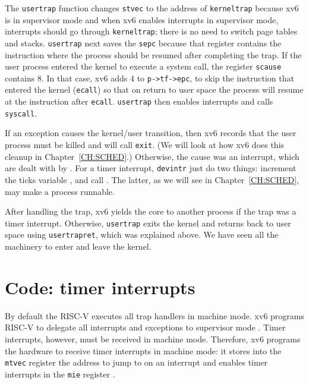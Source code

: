 The \lstinline{usertrap} function changes \lstinline{stvec} to the
address of \lstinline{kerneltrap} because xv6 is in supervisor mode and
when xv6 enables interrupts in supervisor mode, interrupts should go
through \lstinline{kerneltrap}; there is no need to switch page tables
and stacks. \lstinline{usertrap} next saves the \lstinline{sepc}
because that register contains the instruction where the process
should be resumed after completing the trap.
If the user process entered the kernel to execute a system
call, the register \lstinline{scause} contains 8.  In that case, xv6
adds 4 to \lstinline{p->tf->epc}, to skip the instruction that entered
the kernel (\lstinline{ecall}) so that on return to user space the
process will resume at the instruction after \lstinline{ecall}.
\lstinline{usertrap} then enables interrupts and calls
\lstinline{syscall}.

If an exception causes the kernel/user transition, then xv6 records
that the user process must be killed and will call \lstinline{exit}.
(We will look at how xv6 does this cleanup in Chapter~\ref{CH:SCHED}.)
Otherwise, the cause was an interrupt, which are dealt with by
.  For a timer
interrupt, \lstinline{devintr} just do two things: increment the ticks
variable , and call
.  The latter, as
we will see in Chapter~\ref{CH:SCHED}, may make a process runnable.

After handling the trap, xv6 yields
the core to another process if the trap was a timer interrupt.
Otherwise, \lstinline{usertrap} exits the kernel and returns back to
user space using \lstinline{usertrapret}, which was explained above.
We have seen all the machinery to enter and leave the kernel.

\section{Code: timer interrupts}

By default the RISC-V executes all trap handlers in machine mode.  xv6 programs
RISC-V to delegate all interrupts and exceptions to supervisor mode
.
Timer interrupts, however, must be received in machine
mode. Therefore, xv6 programs the hardware to receive timer interrupts in
machine mode: it stores into the \lstinline{mtvec} register the
address to jump to on an interrupt 
and enables timer interrupts in the \lstinline{mie} register
.

